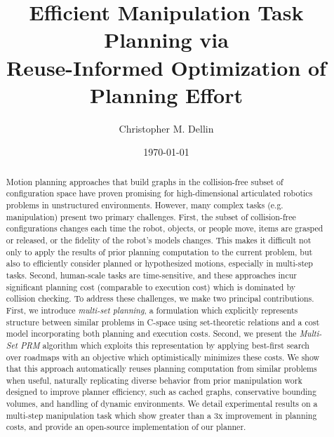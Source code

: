 \documentclass{report}
\title{Efficient Manipulation Task Planning via\\
   Reuse-Informed Optimization of Planning Effort}
\author{Christopher M. Dellin}
\date{\today}
\newcommand{\cdnote}[1]{{\xxnote{CD}{blue}{#1}}}
\newcommand{\xxnote}[3]{}
\renewcommand{\xxnote}[3]{\color{#2}{#1: #3}}
\begin{document}
\maketitle

\begin{abstract}
\cdnote{This is still from the RSS paper.
The intro is more up-to-date.}
Motion planning approaches that build graphs
in the collision-free subset of configuration space
have proven promising
for high-dimensional articulated robotics problems
in unstructured environments.
However, many complex tasks (e.g. manipulation)
present two primary challenges.
First, the subset of collision-free configurations changes each time
the robot, objects, or people move, items are grasped or released,
or the fidelity of the robot's models changes.
This makes it difficult not only to apply the results of prior
planning computation to the current problem,
but also to efficiently consider planned or hypothesized motions,
especially in multi-step tasks.
Second, human-scale tasks are time-sensitive,
and these approaches incur significant planning cost
(comparable to execution cost)
which is dominated by collision checking.
To address these challenges,
we make two principal contributions.
First, we introduce \emph{multi-set planning},
a formulation which explicitly represents structure
between similar problems in C-space
using set-theoretic relations
and a cost model incorporating both planning and execution costs.
Second, we present the \emph{Multi-Set PRM} algorithm
which exploits this representation
by applying best-first search over roadmaps
with an objective which optimistically minimizes these costs.
We show that this approach automatically reuses planning computation
from similar problems when useful,
naturally replicating diverse behavior from prior
manipulation work designed to improve planner efficiency,
such as cached graphs, conservative bounding volumes,
and handling of dynamic environments.
We detail experimental results on a multi-step
manipulation task which show greater than a 3x improvement
in planning costs,
and provide an open-source implementation of our planner.
\end{abstract}

\tableofcontents












\end{document}

